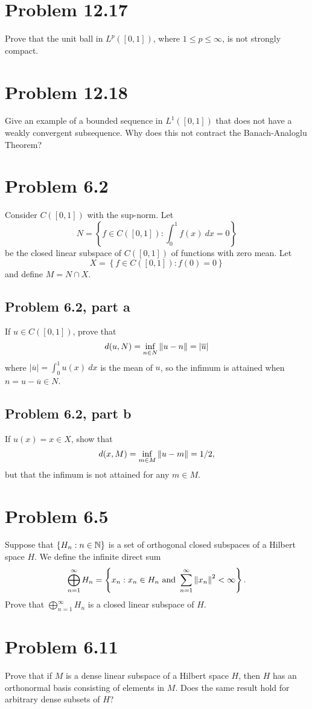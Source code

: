 \newpage
\section{Problem 12.17}
Prove that the unit ball in $L^p([0, 1])$, where $1 \leq p \leq \infty$, is not strongly compact.

\newpage
\section{Problem 12.18}
Give an example of a bounded sequence in $L^1([0, 1])$ that does not have a weakly convergent subsequence. Why does this not contract the Banach-Analoglu Theorem?

\newpage
\section{Problem 6.2}
Consider $C([0, 1])$ with the sup-norm. Let 
\[N = \left \{ f \in C([0, 1]) : \int_0^1 f(x) \ dx = 0\right\}\]
be the closed linear subspace of $C([0, 1])$ of functions with zero mean. Let 
\[X = \left\{ f \in C([0, 1]) : f(0) = 0\right\}\]
and define $M = N \cap X$. 
\subsection{Problem 6.2, part a}
If $u \in C([0, 1])$, prove that 
\[d(u, N) = \inf_{n \in N} \norm{u - n} = |\overline{u}|\]
where $|\overline{u}| = \int_0^1 u(x) \ dx$ is the mean of $u$, so the infimum is attained when $n = u - \overline{u} \in N$. 

\newpage
\subsection{Problem 6.2, part b}
If $u(x) = x \in X$, show that
\[d(x, M) = \inf_{m \in M}\norm{u - m} = 1/2,\]
but that the infimum is not attained for any $m \in M$.

\newpage
\section{Problem 6.5}
Suppose that $\{H_n : n \in \mathbb{N}\}$ is a set of orthogonal closed subspaces of a Hilbert space $H$. We define the infinite direct sum
\[\bigoplus_{n = 1}^\infty H_n = \left \{ x_n : x_n \in H_n \text{ and } \sum_{n=1}^\infty \norm{x_n}^2 < \infty\right\}.\]
Prove that $\bigoplus_{n = 1}^\infty H_n$ is a closed linear subspace of $H$.

\newpage
\section{Problem 6.11}
Prove that if $M$ is a dense linear subspace of a Hilbert space $H$, then $H$ has an orthonormal basis consisting of elements in $M$. Does the same result hold for arbitrary dense subsets of $H$?

